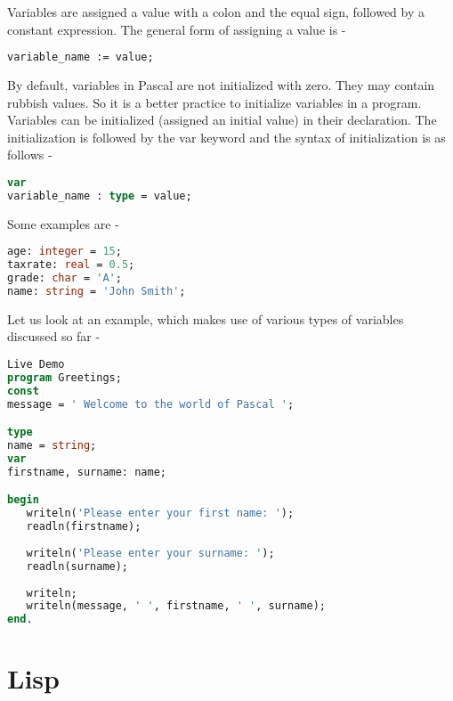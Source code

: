 \documentclass[12pt]{book}
\begin{document}
Variables are assigned a value with a colon and the equal sign, followed by a constant expression. The general form of assigning a value is -


\lstset{style=mystyle}
\begin{lstlisting}[language=Pascal, caption=Pascal example]
variable_name := value;
\end{lstlisting}


By default, variables in Pascal are not initialized with zero. They may contain rubbish values. So it is a better practice to initialize variables in a program. Variables can be initialized (assigned an initial value) in their declaration. The initialization is followed by the var keyword and the syntax of initialization is as follows -


\lstset{style=mystyle}
\begin{lstlisting}[language=Pascal, caption=Pascal example]
var
variable_name : type = value;
\end{lstlisting}




Some examples are -



\lstset{style=mystyle}
\begin{lstlisting}[language=Pascal, caption=Pascal example]
age: integer = 15;
taxrate: real = 0.5;
grade: char = 'A';
name: string = 'John Smith';
\end{lstlisting}


Let us look at an example, which makes use of various types of variables discussed so far -



\lstset{style=mystyle}
\begin{lstlisting}[language=Pascal, caption=Pascal example]
Live Demo
program Greetings;
const
message = ' Welcome to the world of Pascal ';

type
name = string;
var
firstname, surname: name;

begin
   writeln('Please enter your first name: ');
   readln(firstname);
   
   writeln('Please enter your surname: ');
   readln(surname);
   
   writeln;
   writeln(message, ' ', firstname, ' ', surname);
end.
\end{lstlisting}





\section{Lisp}
\end{document}
